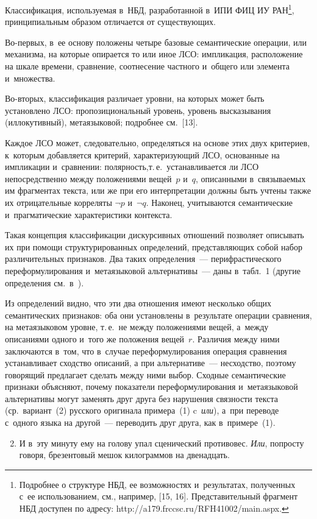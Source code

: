 \begin{multicols}{2}
   Классификация, используемая в~НБД,
разработанной в~ИПИ ФИЦ ИУ РАН\footnote{Подробнее о структуре НБД, 
ее возможностях и~результатах, полученных с~ее использованием, см., например, [15, 16]. 
Представительный фрагмент НБД доступен по адресу: {\sf 
http://a179.frccsc.ru/RFH41002/main.aspx}.}, принципиальным образом отличается от 
существующих. 

Во-пер\-вых, в~ее основу положены четыре базовые 
семантические операции, или механизма, на которые опирается то или иное 
ЛСО: импликация, расположение 
на шкале времени, сравнение, соотнесение частного и~общего или элемента 
и~множества. 
   
   
   Во-вто\-рых, классификация различает уровни, на которых может быть 
установлено ЛСО: пропозициональный уровень, уровень высказывания 
(иллокутивный), метаязыковой; подробнее см.~[13]. 

Каждое ЛСО может, 
следовательно, определяться на основе этих двух критериев, к~которым 
добавляется критерий, характеризующий ЛСО, основанные на импликации 
и~сравнении: полярность,\linebreak т.\,е.\ устанавливается ли ЛСО непосредственно 
между положениями вещей~$p$ и~$q$, описанными в~связываемых им 
фрагментах текста, или же при его интерпретации должны быть учтены также 
их \mbox{отрицательные} корреляты $\neg p$ и~$\neg q$. Наконец, учитываются 
семантические и~прагматические характеристики контекста.
   
   Такая концепция классификации дискурсивных отношений позволяет 
описывать их при помощи структурированных определений, представляющих 
собой набор различительных признаков. Два таких определения~--- 
перифрастического переформулирования и~метаязыковой альтернативы~--- 
даны в~табл.~1 (другие определения см.\ в~\cite{9-in}).

   Из определений видно, что эти два отношения имеют несколько общих 
семантических признаков: оба они установлены в~результате операции 
сравнения, на метаязыковом уровне, т.\,е.\ не между положениями вещей, 
а~между описаниями одного и~того же положения вещей~$r$. Различия между 
ними заключаются в~том, что в~случае переформулирования операция 
сравнения устанавливает сходство описаний, а при альтернативе~--- 
несходство, поэтому говорящий предлагает сделать между ними выбор. 
Сходные семантические признаки объясняют, почему показатели 
переформулирования и~метаязыковой альтернативы могут заменять друг 
друга без нарушения связности текста (ср.\ вариант~(2) русского оригинала 
примера~(1) c~\textit{или}), а~при переводе с~одного языка на другой~--- 
переводить друг друга, как в~примере~(1).
   \begin{enumerate}[(1)]
   \setcounter{enumi}{1}
\item И в~эту минуту ему на голову упал сценический противовес. 
\textit{Или}, попросту говоря, брезентовый мешок килограммов на 
двенадцать.
   \end{enumerate}


\end{multicols}
